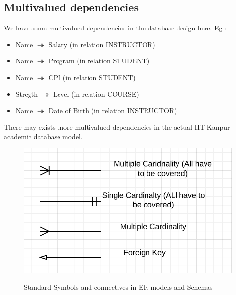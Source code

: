 \documentclass[12pt]{article}%
\begin{document}
\subsection{Multivalued dependencies}
We have some multivalued dependencies in the database design here. Eg :
\begin{itemize}
\item Name $\twoheadrightarrow$ Salary (in relation INSTRUCTOR)
\item Name $\twoheadrightarrow$ Program (in relation STUDENT)
\item Name $\twoheadrightarrow$ CPI (in relation STUDENT)
\item Stregth $\twoheadrightarrow$ Level (in relation COURSE)
\item Name $\twoheadrightarrow$ Date of Birth (in relation INSTRUCTOR)
\end{itemize}
There may exists more multivalued dependencies in the actual IIT Kanpur academic database model.

\begin{figure}
\includegraphics{symbols.png}
\label{fig:er2schema}
\caption{Standard Symbols and connectives in ER models and Schemas}
\end{figure}
\end{document}
